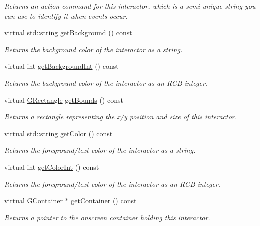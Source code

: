 \begin{DoxyCompactItemize}
\begin{DoxyCompactList}\small\item\em Returns an action command for this interactor, which is a semi-\/unique string you can use to identify it when events occur. \end{DoxyCompactList}\item 
virtual std\+::string \mbox{\hyperlink{classGInteractor_a808e22cc1fdfbecf71ed8c64ef4600e0}{get\+Background}} () const
\begin{DoxyCompactList}\small\item\em Returns the background color of the interactor as a string. \end{DoxyCompactList}\item 
virtual int \mbox{\hyperlink{classGInteractor_a9e827257a55cb8cf4d9de2ec6bcfd7a0}{get\+Background\+Int}} () const
\begin{DoxyCompactList}\small\item\em Returns the background color of the interactor as an R\+GB integer. \end{DoxyCompactList}\item 
virtual \mbox{\hyperlink{structGRectangle}{G\+Rectangle}} \mbox{\hyperlink{classGInteractor_a29e6ac35a0b48f491a4c88194cc5da3b}{get\+Bounds}} () const
\begin{DoxyCompactList}\small\item\em Returns a rectangle representing the x/y position and size of this interactor. \end{DoxyCompactList}\item 
virtual std\+::string \mbox{\hyperlink{classGInteractor_aa061dfa488c31e18549d64363c1d0e34}{get\+Color}} () const
\begin{DoxyCompactList}\small\item\em Returns the foreground/text color of the interactor as a string. \end{DoxyCompactList}\item 
virtual int \mbox{\hyperlink{classGInteractor_a9635c7af766cdc3417f346683fa0e6c1}{get\+Color\+Int}} () const
\begin{DoxyCompactList}\small\item\em Returns the foreground/text color of the interactor as an R\+GB integer. \end{DoxyCompactList}\item 
virtual \mbox{\hyperlink{classGContainer}{G\+Container}} $\ast$ \mbox{\hyperlink{classGInteractor_a7a6e317c29d61030929b4cd2d1c00fe7}{get\+Container}} () const
\begin{DoxyCompactList}\small\item\em Returns a pointer to the onscreen container holding this interactor. \end{DoxyCompactList}\item 

\end{DoxyCompactItemize}

